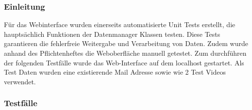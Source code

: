 \subsubsection{Einleitung}

Für das Webinterface wurden einerseits automatisierte Unit Tests erstellt, die hauptsächlich Funktionen der Datenmanager Klassen testen. Diese Tests garantieren die fehlerfreie Weitergabe und Verarbeitung von Daten. Zudem wurde anhand des Pflichtenheftes die Weboberfläche manuell getestet. Zum durchführen der folgenden Testfälle wurde das Web-Interface auf dem localhost gestartet. Als Test Daten wurden eine existierende Mail Adresse sowie wie 2 Test Videos verwendet.

\subsubsection{Testfälle}

